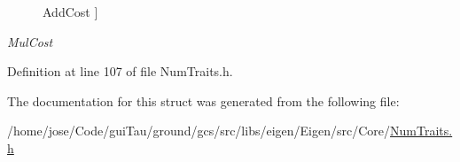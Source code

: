 \begin{Desc}
\begin{description}
{\hypertarget{struct_num_traits_3_01long_01long_01int_01_4_a1c11d0a64a908327399ab65734320988a619f02851a8a744efbba7695653f2e53}{Add\-Cost}\label{struct_num_traits_3_01long_01long_01int_01_4_a1c11d0a64a908327399ab65734320988a619f02851a8a744efbba7695653f2e53}
}]\item[{\em 
\hypertarget{struct_num_traits_3_01long_01long_01int_01_4_a1c11d0a64a908327399ab65734320988a2c88aa8aac8fb160dda0d2d16922bf2a}{Mul\-Cost}\label{struct_num_traits_3_01long_01long_01int_01_4_a1c11d0a64a908327399ab65734320988a2c88aa8aac8fb160dda0d2d16922bf2a}
}]\end{description}
\end{Desc}


Definition at line 107 of file Num\-Traits.\-h.



The documentation for this struct was generated from the following file\-:\begin{DoxyCompactItemize}
\item 
/home/jose/\-Code/gui\-Tau/ground/gcs/src/libs/eigen/\-Eigen/src/\-Core/\hyperlink{_num_traits_8h}{Num\-Traits.\-h}\end{DoxyCompactItemize}
